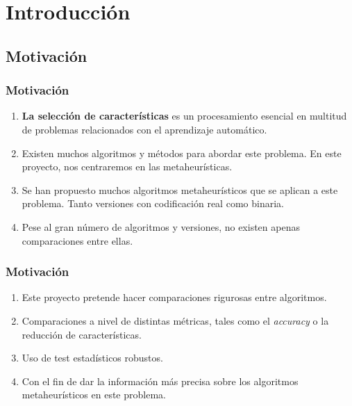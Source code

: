 \section{Introducción}

\subsection{Motivación}
\begin{frame}
  \frametitle{Motivación}
  \begin{enumerate}
    \item \textbf{La selección de características} es un procesamiento esencial en multitud de problemas relacionados con el aprendizaje automático.
    \item Existen muchos algoritmos y métodos para abordar este problema. En este proyecto, nos centraremos en las metaheurísticas.
    \item Se han propuesto muchos algoritmos metaheurísticos que se aplican a este problema. Tanto versiones con codificación real como binaria.
    \item Pese al gran número de algoritmos y versiones, no existen apenas comparaciones entre ellas.
  \end{enumerate}
  \vspace{-.2cm}
\end{frame}

\begin{frame}
  \frametitle{Motivación}
  \begin{enumerate}
    \item Este proyecto pretende hacer comparaciones rigurosas entre algoritmos.
    \item Comparaciones a nivel de distintas métricas, tales como el \textit{accuracy} o la reducción de características.
    \item Uso de test estadísticos robustos.
    \item Con el fin de dar la información más precisa sobre los algoritmos metaheurísticos en este problema.
  \end{enumerate}
  \vspace{-.2cm}
\end{frame}

\note{

}

